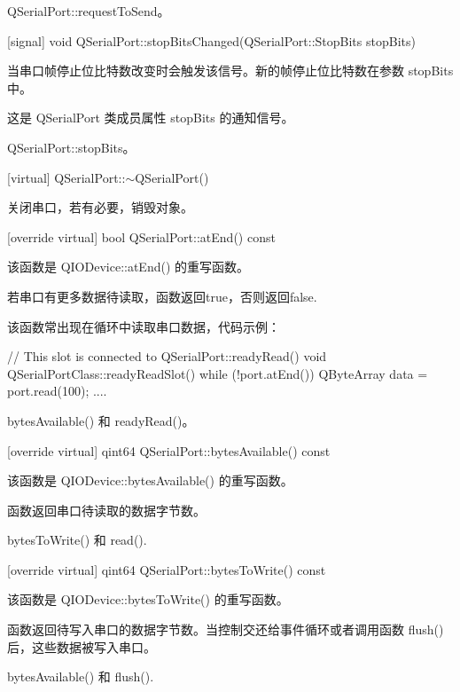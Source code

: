 \begin{seeAlso}
QSerialPort::requestToSend。
\end{seeAlso}

[signal] void QSerialPort::stopBitsChanged(QSerialPort::StopBits stopBits)

当串口帧停止位比特数改变时会触发该信号。新的帧停止位比特数在参数 stopBits 中。

\begin{notice}
这是 QSerialPort 类成员属性 stopBits 的通知信号。
\end{notice}

\begin{seeAlso}
QSerialPort::stopBits。
\end{seeAlso}

[virtual] QSerialPort::$\sim$QSerialPort()

关闭串口，若有必要，销毁对象。

[override virtual] bool QSerialPort::atEnd() const

该函数是 QIODevice::atEnd() 的重写函数。

若串口有更多数据待读取，函数返回true，否则返回false.

该函数常出现在循环中读取串口数据，代码示例：

\begin{cppcode}
// This slot is connected to QSerialPort::readyRead()
void QSerialPortClass::readyReadSlot()
{
    while (!port.atEnd()) {
        QByteArray data = port.read(100);
        ....
    }
}
\end{cppcode}

\begin{seeAlso}
bytesAvailable() 和 readyRead()。
\end{seeAlso}

[override virtual] qint64 QSerialPort::bytesAvailable() const

该函数是 QIODevice::bytesAvailable() 的重写函数。

函数返回串口待读取的数据字节数。

\begin{seeAlso}
bytesToWrite() 和 read().
\end{seeAlso}

[override virtual] qint64 QSerialPort::bytesToWrite() const

该函数是 QIODevice::bytesToWrite() 的重写函数。

函数返回待写入串口的数据字节数。当控制交还给事件循环或者调用函数 flush() 后，这些数据被写入串口。

\begin{seeAlso}
bytesAvailable() 和 flush().
\end{seeAlso}

